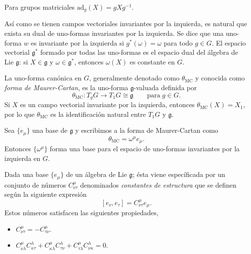 Para grupos matriciales $\mathrm{ad}_{g} (X) = g X g^{-1}$.

\begin{mydef} \cite{Warner}
As\'{i} como se tienen campos vectoriales invariantes por la izquierda, es natural que exista su dual de uno-formas invariantes por la izquierda. Se dice que una uno-forma $w$ es invariante por la izquierda si $g^{*} (\omega) = \omega$ para todo $g \in G$. El espacio vectorial $\mathfrak{g}^{*}$ formado por todas las uno-formas es el espacio dual del \'{a}lgebra de Lie $\mathfrak{g}$: si $X \in \mathfrak{g}$ y $\omega \in \mathfrak{g}^{*}$, entonces $\omega (X)$ es constante en $G$.
\end{mydef}

\begin{mydef} \cite{Choquet}
La uno-forma can\'{o}nica en $G$, generalmente denotado como $\theta_{\mathrm{MC}}$ y conocida como \emph{forma de Maurer-Cartan}, es la uno-forma $\mathfrak{g}$-valuada definida por
%
\begin{equation*}
\theta_{\mathrm{MC}}: T_{g} G \longrightarrow T_{1} G \cong \mathfrak{g} \qquad \mathrm{para} \; g \in G.
\end{equation*}
%
Si $X$ es un campo vectorial invariante por la izquierda, entonces $\theta_{\mathrm{MC}} (X) = X_{1}$, por lo que $\theta_{\mathrm{MC}}$ es la identificaci\'{o}n natural entre $T_{1} G$ y $\mathfrak{g}$. 
\end{mydef}

Sea $\{e_{\mu}\}$ una base de $\mathfrak{g}$ y escribimos a la forma de Maurer-Cartan como $$\theta_{\mathrm{MC}} = \omega^{\mu} e_{\mu}.$$ Entonces $\{ \omega^{\mu} \}$ forma una base para el espacio de uno-formas invariantes por la izquierda en $G$.

\begin{mydef} \cite{Choquet}
Dada una base $\{e_{\mu}\}$ de un \'{a}lgebra de Lie $\mathfrak{g}$; \'{e}sta viene espec\'{i}ficada por un conjunto de n\'{u}meros $C^{\mu}_{\nu \tau}$ denominados \emph{constantes de estructura} que se definen seg\'{u}n la siguiente expresi\'{o}n $$[e_{\nu}, e_{\tau}] = C^{\mu}_{\nu \tau} e_{\mu}.$$ Estos n\'{u}meros satisfacen las siguientes propiedades,
%
\begin{itemize}
\item{$C^{\mu}_{\nu \tau} = -C^{\mu}_{\tau \nu}$.}
\item{$C^{\mu}_{\nu \lambda} C^{\lambda}_{\kappa \tau} + C^{\mu}_{\kappa \lambda} C^{\lambda}_{\tau \nu} + C^{\mu}_{\tau \lambda} C^{\lambda}_{\nu \kappa} = 0$.}
\end{itemize}
%
\end{mydef}

